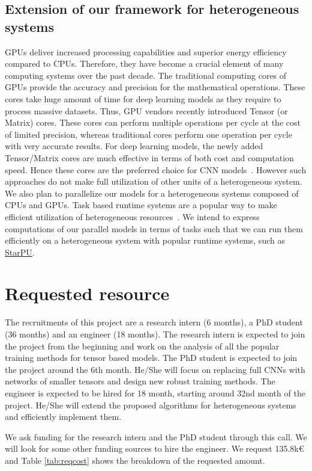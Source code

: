 \documentclass[11pt]{article}
\begin{document}
\subsection{Extension of our framework for heterogeneous systems}
GPUs deliver increased processing capabilities and superior energy efficiency compared to CPUs. Therefore, they have become a crucial element of many computing systems over the past decade. The traditional computing cores of GPUs provide the accuracy and precision for the mathematical operations. These cores take huge amount of time for deep learning models as they require to process massive datasets. Thus, GPU vendors recently introduced Tensor (or Matrix) cores. These cores can perform multiple operations per cycle at the cost of limited precision, whereas traditional cores perform one operation per cycle with very accurate results. For deep learning models, the newly added Tensor/Matrix cores are much effective in terms of both cost and computation speed. Hence these cores are the preferred choice for CNN models~\cite{KSH-Resnet-2017}. However such approaches do not make full utilization of other units of a heterogeneous system. We also plan to parallelize our models for a heterogeneous systems composed of CPUs and GPUs. Task based runtime systems are a popular way to make efficient utilization of heterogeneous resources~\cite{ATNW-Euro-Par-2009}. We intend to express computations of our parallel models in terms of tasks such that we can run them efficiently on a heterogeneous system with popular runtime systems, such as \href{https://starpu.gitlabpages.inria.fr}{StarPU}.



\section{Requested resource}
The recruitments of this project are a research intern (6 months), a PhD student  (36 months) and an engineer (18 months). The  research intern is expected to join the project from the beginning and work on the analysis of all the popular training methods for tensor based models. The PhD student is expected to join the project around the 6th month. He/She will focus on replacing full CNNs  with networks of smaller tensors and design new robust training methods. The engineer is expected to be hired for 18 month, starting around 32nd month of the project. He/She will extend the proposed algorithms for heterogeneous systems and efficiently implement them. 

We ask funding for the research intern and the PhD student through this call. We will look for some other funding sources to hire the engineer.  We request 135.8k\euro\xspace and Table \ref{tab:reqcost} shows the breakdown of the requested amount.
\end{document}
